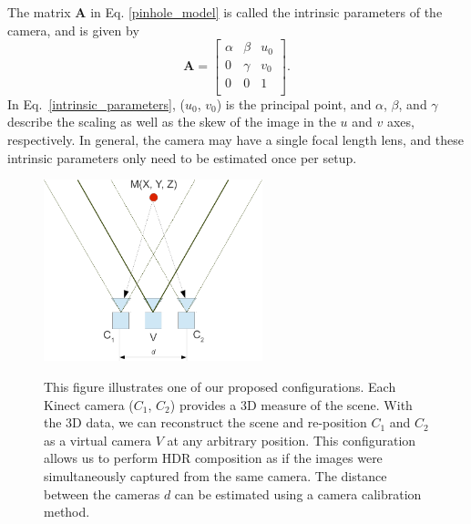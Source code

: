 The matrix $\mathbf{A}$ in Eq. \ref{pinhole_model} is called the intrinsic parameters of the camera, and is given by 
\begin{equation}
\mathbf{A} = 
\begin{bmatrix} 
  \alpha & \beta & u_{0}\\ 
  0 & \gamma & v_{0} \\
  0 & 0 & 1 \\  
\end{bmatrix}.
\label{intrinsic_parameters}
\end{equation} 
In Eq.~\ref{intrinsic_parameters}, ($u_{0}$, $v_{0}$) is the principal point, and $\alpha$, $\beta$, and $\gamma$ describe the scaling as well as the skew of the image in the $u$ and $v$ axes, respectively. In general, the camera may have a single focal length lens, and these intrinsic parameters only need to be estimated once per setup.
\begin{figure}
\centering
\includegraphics[width=2.5in]{ch4/diagrams/multi_virt_cam2.pdf} \\
\caption{This figure illustrates one of our proposed configurations. Each Kinect camera ($C_1$, $C_2$) provides a 3D measure of the scene. With the 3D data, we can reconstruct the scene and re-position $C_1$ and $C_2$ as a virtual camera $V$ at any arbitrary position. This configuration allows us to perform HDR composition as if the images were simultaneously captured from the same camera. The distance between the cameras $d$ can be estimated using a camera calibration method.}
\label{fig_v_camera}
\end{figure}
